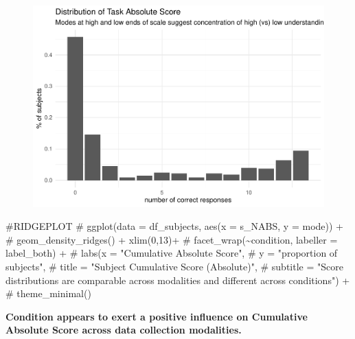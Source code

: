 \documentclass[
  letterpaper,
  DIV=11,
  numbers=noendperiod]{scrreprt}
\newenvironment{Shaded}{\begin{snugshade}}{\end{snugshade}}
\newcommand{\CommentTok}[1]{\textcolor[rgb]{0.37,0.37,0.37}{#1}}
\begin{document}
\begin{figure}[H]

{\centering \includegraphics{analysis/SGC3A/3_sgc3A_description_files/figure-pdf/VIS-SUBJ-ABS-1.pdf}

}

\end{figure}

\begin{Shaded}
\begin{Highlighting}[]
\CommentTok{\#RIDGEPLOT}
\CommentTok{\# ggplot(data = df\_subjects, aes(x = s\_NABS, y = mode)) +}
\CommentTok{\#   geom\_density\_ridges() + xlim(0,13)+}
\CommentTok{\#   facet\_wrap(\textasciitilde{}condition, labeller = label\_both) +}
\CommentTok{\#  labs(x = "Cumulative Absolute Score",}
\CommentTok{\#       y = "proportion of subjects",}
\CommentTok{\#        title = "Subject Cumulative Score (Absolute)",}
\CommentTok{\#        subtitle = "Score distributions are comparable across modalities and different across conditions") + }
\CommentTok{\#   theme\_minimal()}
\end{Highlighting}
\end{Shaded}

\begin{tcolorbox}[standard jigsaw,colframe=quarto-callout-color-frame, arc=.35mm, titlerule=0mm, toptitle=1mm, bottomtitle=1mm, rightrule=.15mm, title={Decision}, leftrule=.75mm, toprule=.15mm, bottomrule=.15mm, opacityback=0, colbacktitle=quarto-callout-color!10!white, left=2mm, opacitybacktitle=0.6, coltitle=black, colback=white]
\textbf{Condition appears to exert a positive influence on Cumulative
Absolute Score across data collection modalities.}
\end{tcolorbox}
\end{document}
